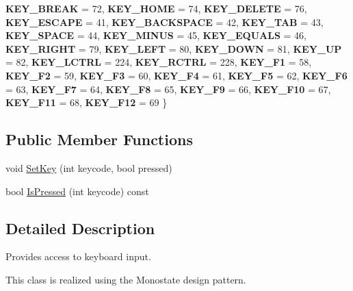 \begin{DoxyCompactItemize}
{\bfseries K\+E\+Y\+\_\+\+B\+R\+E\+AK} = 72, 
{\bfseries K\+E\+Y\+\_\+\+H\+O\+ME} = 74, 
\newline
{\bfseries K\+E\+Y\+\_\+\+D\+E\+L\+E\+TE} = 76, 
{\bfseries K\+E\+Y\+\_\+\+E\+S\+C\+A\+PE} = 41, 
{\bfseries K\+E\+Y\+\_\+\+B\+A\+C\+K\+S\+P\+A\+CE} = 42, 
{\bfseries K\+E\+Y\+\_\+\+T\+AB} = 43, 
\newline
{\bfseries K\+E\+Y\+\_\+\+S\+P\+A\+CE} = 44, 
{\bfseries K\+E\+Y\+\_\+\+M\+I\+N\+US} = 45, 
{\bfseries K\+E\+Y\+\_\+\+E\+Q\+U\+A\+LS} = 46, 
{\bfseries K\+E\+Y\+\_\+\+R\+I\+G\+HT} = 79, 
\newline
{\bfseries K\+E\+Y\+\_\+\+L\+E\+FT} = 80, 
{\bfseries K\+E\+Y\+\_\+\+D\+O\+WN} = 81, 
{\bfseries K\+E\+Y\+\_\+\+UP} = 82, 
{\bfseries K\+E\+Y\+\_\+\+L\+C\+T\+RL} = 224, 
\newline
{\bfseries K\+E\+Y\+\_\+\+R\+C\+T\+RL} = 228, 
{\bfseries K\+E\+Y\+\_\+\+F1} = 58, 
{\bfseries K\+E\+Y\+\_\+\+F2} = 59, 
{\bfseries K\+E\+Y\+\_\+\+F3} = 60, 
\newline
{\bfseries K\+E\+Y\+\_\+\+F4} = 61, 
{\bfseries K\+E\+Y\+\_\+\+F5} = 62, 
{\bfseries K\+E\+Y\+\_\+\+F6} = 63, 
{\bfseries K\+E\+Y\+\_\+\+F7} = 64, 
\newline
{\bfseries K\+E\+Y\+\_\+\+F8} = 65, 
{\bfseries K\+E\+Y\+\_\+\+F9} = 66, 
{\bfseries K\+E\+Y\+\_\+\+F10} = 67, 
{\bfseries K\+E\+Y\+\_\+\+F11} = 68, 
\newline
{\bfseries K\+E\+Y\+\_\+\+F12} = 69
 \}
\end{DoxyCompactItemize}
\subsection*{Public Member Functions}
\begin{DoxyCompactItemize}
\item 
void \hyperlink{classastu_1_1Keyboard_ad664e339aaba324018cedbab3efac9b3}{Set\+Key} (int keycode, bool pressed)
\item 
bool \hyperlink{classastu_1_1Keyboard_ac084da5fb7d052612fed0d465048835e}{Is\+Pressed} (int keycode) const
\end{DoxyCompactItemize}


\subsection{Detailed Description}
Provides access to keyboard input.

This class is realized using the Monostate design pattern. 

